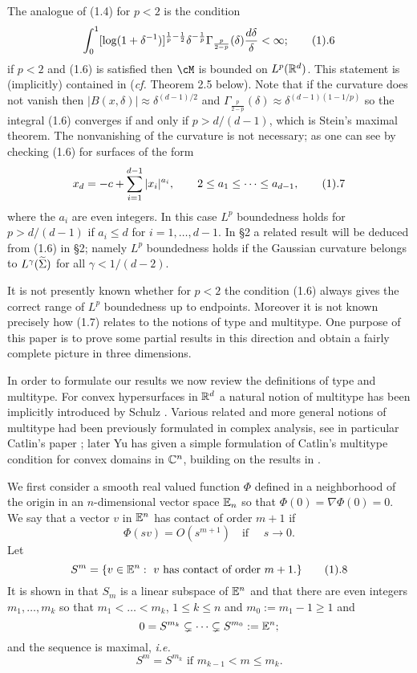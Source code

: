 The analogue of (1.4) for $p<2$ is the condition
$$
\int_0^1
[\log(1+\delta^{-1})]^{\frac 1p-\frac 12}\delta^{-\frac 1 p}
\Gamma_{\frac{p}{2-p}}(\delta)\frac {d\delta}{\delta}
<\infty;
\tag 1.6
$$
if $p<2$ and (1.6) is satisfied then
$\cM$ is bounded on $L^p(\Bbb R^d)$. This statement is 
(implicitly) contained in \cite{18} ({\it cf.} Theorem 2.5 below).
Note that if the curvature does not vanish then
  $|B(x,\delta)|\approx \delta^{(d-1)/2}$ and 
$\Gamma_{\frac{p}{2-p}}(\delta)\approx\delta^{(d-1)(1-1/p)}$ so the integral
(1.6) converges if and only if $p>d/(d-1)$, which is Stein's maximal theorem.
The nonvanishing of the curvature is not necessary; as one can see by
checking (1.6) for surfaces of the form
$$x_d=-c+\sum_{i=1}^{d-1}|x_i|^{a_i},\qquad   2\le a_1\le \dots\le a_{d-1},
\tag 1.7
$$ where the $a_i$ are even integers. In this case $L^p$ boundedness holds for
$p>d/(d-1)$ if $a_i\le d$ for $i=1,\dots,d-1$. 
In \S2 a related 
result will be deduced from (1.6) in \S2; namely $L^p$ boundedness holds
if the Gaussian curvature belongs to $L^\gamma({\widetilde \Sigma})$ for all 
$\gamma<1/(d-2)$.



It is not presently known whether for $p<2$ the condition 
(1.6) always gives the
correct range of $L^p$ boundedness up to endpoints.
 Moreover it is not known
precisely how  (1.7) relates to the notions of type and multitype.
One purpose  of this paper is to prove some partial results in this direction
and obtain a  fairly complete picture in three dimensions.

\medskip 

In order to formulate our results we now
review the definitions of type and
 multitype. For convex hypersurfaces  in $\Bbb R^d$ 
a natural notion of multitype has been implicitly 
 introduced by Schulz \cite{20}. Various related and  more general 
notions of multitype 
had been previously formulated in complex analysis, see in particular 
Catlin's paper \cite{3}; 
later Yu \cite{26} has given a simple formulation of Catlin's 
multitype condition for convex domains in $\Bbb C^n$, building on the 
results in \cite{20}.

We  first consider a smooth real valued
 function $\Phi$ defined in a neighborhood of the origin in
an $n$-dimensional vector space
$\Bbb E_n$  so that $\Phi(0)=\nabla \Phi(0)=0$.
We say that a vector
 $v$ in $\Bbb E^n$  has contact of order $m+1$ if
$$
\Phi(sv)=O(s^{m+1})\quad \text {if }\quad  s\to 0.
$$
Let $$S^m=\{v\in \Bbb E^n: \text{ $v$ has contact of order $m+1$.}\}
\tag 1.8$$
It is shown in \cite{20} that $S_m$ is a linear subspace of 
$\Bbb E^n$ and that   there are   even integers $m_1,\dots, m_k$ so that
$m_1<\dots<m_k$, $1\le k\le n$ and $m_0:= m_1-1\ge 1$ and
$$
0=S^{m_k}\subsetneq\dots \subsetneq S^{m_0}:=\Bbb E^{n};
$$
and the sequence is maximal, {\it i.e.}
$$S^m=S^{m_{k}}\text {  if } m_{k-1}< m\le  m_k.$$


